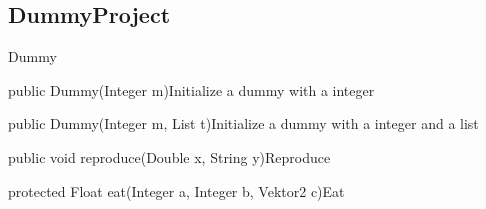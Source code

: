 \subsection{DummyProject}
\begin{absclass}{Dummy} 



    \begin{attributes}
    \end{attributes}

    \begin{constructors}
        \begin{constructor}{public Dummy(Integer m)}{Initialize a dummy with a integer}
            \begin{parameters}
            \end{parameters}
        \end{constructor}

        \begin{constructor}{public Dummy(Integer m, List t)}{Initialize a dummy with a integer and a list}
            \begin{parameters}
            \end{parameters}
        \end{constructor}
    \end{constructors}


    \begin{methods}
        \begin{method}{public void reproduce(Double x, String y)}{Reproduce}
            \begin{parameters}
            \end{parameters}
        \end{method}
        \begin{method}{protected Float eat(Integer a, Integer b, Vektor2 c)}{Eat}
            \begin{parameters}
            \end{parameters}
        \end{method}
    \end{methods}
\end{absclass}
